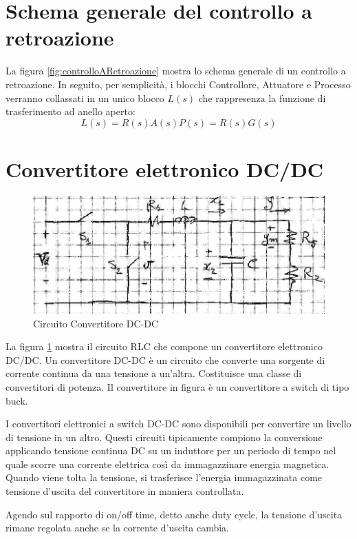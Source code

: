 \documentclass[a4paper]{report}
\begin{document}
\section{Schema generale del controllo a retroazione}

La figura \ref{fig:controlloARetroazione} mostra lo schema generale di
un controllo a retroazione. In seguito, per semplicit\`a, i blocchi
Controllore, Attuatore e Processo verranno collassati in un unico
blocco $L(s)$ che rappresenza la funzione di trasferimento ad anello
aperto:
\[
L(s) = R(s) A(s) P(s) = R(s) G(s)
\]

\section{Convertitore elettronico DC/DC}
\begin{figure}[!h]
  \begin{center}
    \includegraphics[scale=0.25]{./images/convertitore-dcdc}
    \caption{Circuito Convertitore DC-DC}\label{fig:convertitore-dcdc}
  \end{center}
\end{figure}
La figura \ref{fig:convertitore-dcdc} mostra il circuito RLC che compone un
convertitore elettronico DC/DC. Un convertitore DC-DC \`e un circuito
che converte una sorgente di corrente continua da una tensione a
un'altra. Costituisce una classe di convertitori di potenza. Il
convertitore in figura \`e un convertitore a switch di tipo buck.

I convertitori elettronici a switch DC-DC sono disponibili per
convertire un livello di tensione in un altro. Questi circuiti
tipicamente compiono la conversione applicando tensione continua DC su
un induttore per un periodo di tempo nel quale scorre una corrente
elettrica cos\`i da immagazzinare energia magnetica. Quando viene
tolta la tensione, si trasferisce l'energia immagazzinata come tensione
d'uscita del convertitore in maniera controllata.

Agendo sul rapporto di on/off time, detto anche duty cycle, la
tensione d'uscita rimane regolata anche se la corrente d'uscita cambia.
\end{document}
